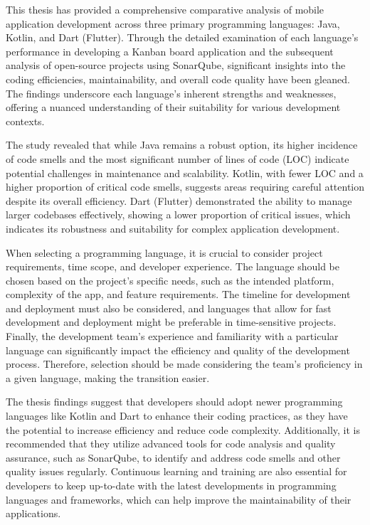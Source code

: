 This thesis has provided a comprehensive comparative analysis of mobile application development across three primary programming languages: Java, Kotlin, and Dart (Flutter). Through the detailed examination of each language's performance in developing a Kanban board application and the subsequent analysis of open-source projects using SonarQube, significant insights into the coding efficiencies, maintainability, and overall code quality have been gleaned. The findings underscore each language's inherent strengths and weaknesses, offering a nuanced understanding of their suitability for various development contexts.
\par
The study revealed that while Java remains a robust option, its higher incidence of code smells and the most significant number of lines of code (LOC) indicate potential challenges in maintenance and scalability. Kotlin, with fewer LOC and a higher proportion of critical code smells, suggests areas requiring careful attention despite its overall efficiency. Dart (Flutter) demonstrated the ability to manage larger codebases effectively, showing a lower proportion of critical issues, which indicates its robustness and suitability for complex application development.
\par
When selecting a programming language, it is crucial to consider project requirements, time scope, and developer experience. The language should be chosen based on the project's specific needs, such as the intended platform, complexity of the app, and feature requirements. The timeline for development and deployment must also be considered, and languages that allow for fast development and deployment might be preferable in time-sensitive projects. Finally, the development team's experience and familiarity with a particular language can significantly impact the efficiency and quality of the development process. Therefore, selection should be made considering the team's proficiency in a given language, making the transition easier.
\par
The thesis findings suggest that developers should adopt newer programming languages like Kotlin and Dart to enhance their coding practices, as they have the potential to increase efficiency and reduce code complexity. Additionally, it is recommended that they utilize advanced tools for code analysis and quality assurance, such as SonarQube, to identify and address code smells and other quality issues regularly. Continuous learning and training are also essential for developers to keep up-to-date with the latest developments in programming languages and frameworks, which can help improve the maintainability of their applications.
